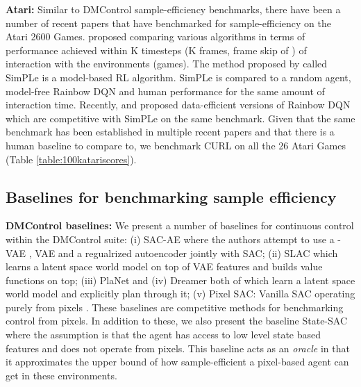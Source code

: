 \documentclass{article}
\begin{document}
{\textbf{Atari:}} Similar to DMControl sample-efficiency benchmarks, there have been a number of recent papers that have benchmarked for sample-efficiency on the Atari 2600 Games. \citet{kaiser2019model} proposed comparing various algorithms in terms of performance achieved within K timesteps (K frames, frame skip of ) of interaction with the environments (games). The method proposed by \citet{kaiser2019model} called SimPLe is a model-based RL algorithm. SimPLe is compared to a random agent, model-free Rainbow DQN \cite{hessel2017rainbow} and human performance for the same amount of interaction time. Recently, \citet{van2019use} and \citet{kielak2020rainbow} proposed data-efficient versions of Rainbow DQN which are competitive with SimPLe on the same benchmark. Given that the same benchmark has been established in multiple recent papers and that there is a human baseline to compare to, we benchmark CURL on all the 26 Atari Games (Table \ref{table:100katariscores}).

\subsection{Baselines for benchmarking sample efficiency}
\textbf{DMControl baselines:} We present a number of baselines for continuous control within the DMControl suite: (i) SAC-AE \cite{yarats2019improving} where the authors attempt to use a -VAE \cite{higgins2017darla}, VAE \cite{kingma2013auto} and a regualrized autoencoder \citet{vincent2008extracting,ghosh2019} jointly with SAC; (ii) SLAC \cite{lee2019stochastic} which learns a latent space world model on top of VAE features \citet{ha2018world} and builds value functions on top; (iii) PlaNet and (iv) Dreamer \cite{hafner2018learning, hafner2019dream} both of which learn a latent space world model and explicitly plan through it; (v) Pixel SAC: Vanilla SAC operating purely from pixels \cite{haarnoja2018soft}. These baselines are competitive methods for benchmarking control from pixels. In addition to these, we also present the baseline State-SAC where the assumption is that the agent has access to low level state based features and does not operate from pixels. This baseline acts as an {\it oracle} in that it approximates the upper bound of how sample-efficient a pixel-based agent can get in these environments. 
\end{document}
